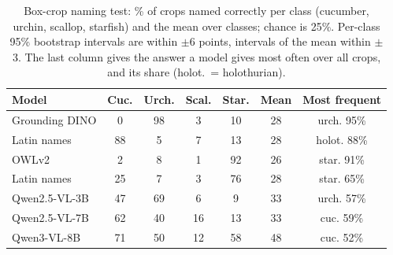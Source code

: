 \begin{table}[!ht]
\centering
\small
\setlength{\tabcolsep}{2.2pt}
\begin{tabular}{lcccccc}
\toprule
Model & Cuc. & Urch. & Scal. & Star. & Mean & Most frequent \\
\midrule
Grounding DINO & 0 & 98 & 3 & 10 & 28 & urch. 95\% \\
\quad Latin names & 88 & 5 & 7 & 13 & 28 & holot. 88\% \\
OWLv2 & 2 & 8 & 1 & 92 & 26 & star. 91\% \\
\quad Latin names & 25 & 7 & 3 & 76 & 28 & star. 65\% \\
Qwen2.5-VL-3B & 47 & 69 & 6 & 9 & 33 & urch. 57\% \\
Qwen2.5-VL-7B & 62 & 40 & 16 & 13 & 33 & cuc. 59\% \\
Qwen3-VL-8B & 71 & 50 & 12 & 58 & 48 & cuc. 52\% \\
\bottomrule
\end{tabular}
\caption{Box-crop naming test: \% of crops named correctly per class (cucumber, urchin, scallop, starfish) and the mean over classes; chance is 25\%. Per-class 95\% bootstrap intervals are within $\pm$6 points, intervals of the mean within $\pm$3. The last column gives the answer a model gives most often over all crops, and its share (holot.\ = holothurian).}
\label{tab:crops}
\end{table}
